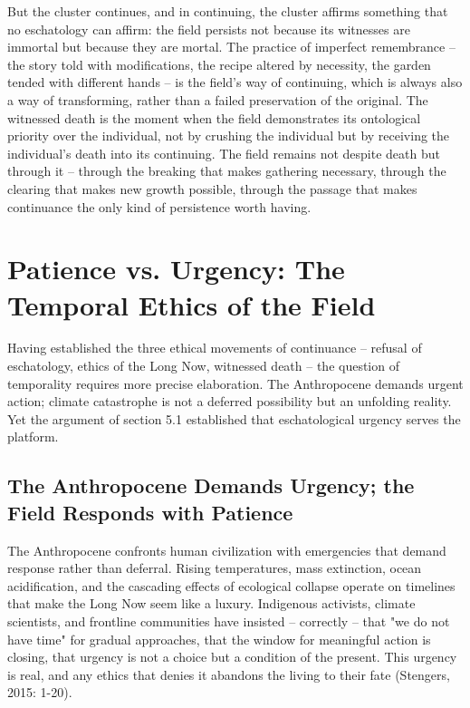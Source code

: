 But the cluster continues, and in continuing, the cluster affirms something that no eschatology can affirm: the field persists not because its witnesses are immortal but because they are mortal. The practice of imperfect remembrance -- the story told with modifications, the recipe altered by necessity, the garden tended with different hands -- is the field's way of continuing, which is always also a way of transforming, rather than a failed preservation of the original. The witnessed death is the moment when the field demonstrates its ontological priority over the individual, not by crushing the individual but by receiving the individual's death into its continuing. The field remains not despite death but through it -- through the breaking that makes gathering necessary, through the clearing that makes new growth possible, through the passage that makes continuance the only kind of persistence worth having.

\section{Patience vs. Urgency: The Temporal Ethics of the Field}

Having established the three ethical movements of continuance -- refusal of eschatology, ethics of the Long Now, witnessed death -- the question of temporality requires more precise elaboration. The Anthropocene demands urgent action; climate catastrophe is not a deferred possibility but an unfolding reality. Yet the argument of section 5.1 established that eschatological urgency serves the platform.

\subsection{The Anthropocene Demands Urgency; the Field Responds with Patience}

The Anthropocene confronts human civilization with emergencies that demand response rather than deferral. Rising temperatures, mass extinction, ocean acidification, and the cascading effects of ecological collapse operate on timelines that make the Long Now seem like a luxury. Indigenous activists, climate scientists, and frontline communities have insisted -- correctly -- that "we do not have time" for gradual approaches, that the window for meaningful action is closing, that urgency is not a choice but a condition of the present. This urgency is real, and any ethics that denies it abandons the living to their fate (Stengers, 2015: 1-20).

